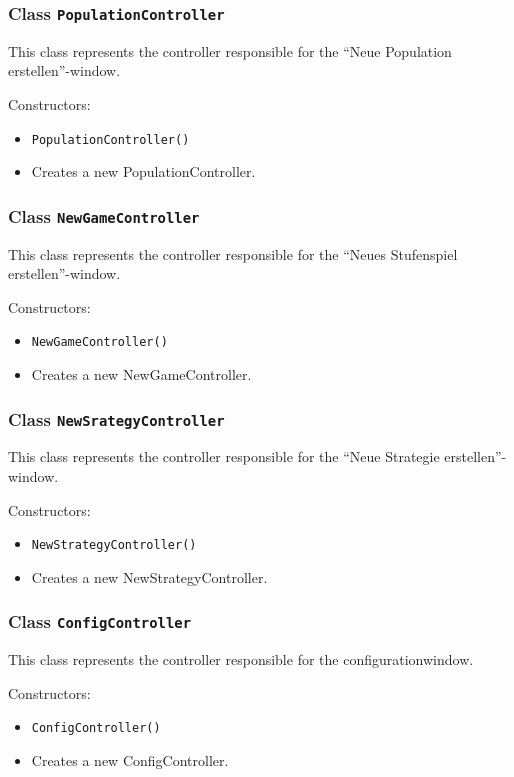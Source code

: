\documentclass[parskip=full,11pt]{scrartcl}
\begin{document}
\subsubsection{Class \texttt{PopulationController}}
This class represents the controller responsible for the \enquote{Neue Population erstellen}-window.

Constructors:
\begin{itemize}\itemsep -10pt
\item \texttt{PopulationController()}
\item[] Creates a new PopulationController.
\end{itemize}

\subsubsection{Class \texttt{NewGameController}}
This class represents the controller responsible for the \enquote{Neues Stufenspiel erstellen}-window.

Constructors:
\begin{itemize}\itemsep -10pt
\item \texttt{NewGameController()}
\item[] Creates a new NewGameController.
\end{itemize}

\subsubsection{Class \texttt{NewSrategyController}}
This class represents the controller responsible for the \enquote{Neue Strategie erstellen}-window.

Constructors:
\begin{itemize}\itemsep -10pt
\item \texttt{NewStrategyController()}
\item[] Creates a new NewStrategyController.
\end{itemize}

\subsubsection{Class \texttt{ConfigController}}
This class represents the controller responsible for the configurationwindow.

Constructors:
\begin{itemize}\itemsep -10pt
\item \texttt{ConfigController()}
\item[] Creates a new ConfigController.
\end{itemize}
\end{document}
